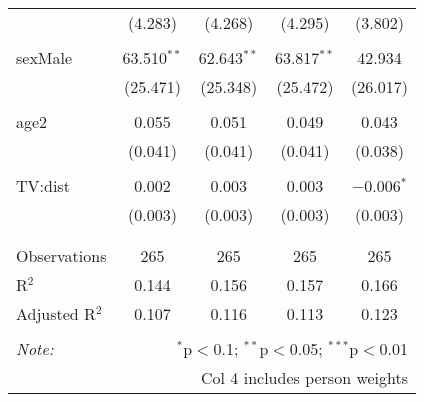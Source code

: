 \begin{table}[!htbp]
\begin{tabular}{@{\extracolsep{-5pt}}lcccc}
  & (4.283) & (4.268) & (4.295) & (3.802) \\ 
  & & & & \\ 
 sexMale & 63.510$^{**}$ & 62.643$^{**}$ & 63.817$^{**}$ & 42.934 \\ 
  & (25.471) & (25.348) & (25.472) & (26.017) \\ 
  & & & & \\ 
 age2 & 0.055 & 0.051 & 0.049 & 0.043 \\ 
  & (0.041) & (0.041) & (0.041) & (0.038) \\ 
  & & & & \\ 
 TV:dist & 0.002 & 0.003 & 0.003 & $-$0.006$^{*}$ \\ 
  & (0.003) & (0.003) & (0.003) & (0.003) \\ 
  & & & & \\ 
\hline \\[-1.8ex] 
Observations & 265 & 265 & 265 & 265 \\ 
R$^{2}$ & 0.144 & 0.156 & 0.157 & 0.166 \\ 
Adjusted R$^{2}$ & 0.107 & 0.116 & 0.113 & 0.123 \\ 
\hline 
\hline \\[-1.8ex] 
\textit{Note:}  & \multicolumn{4}{r}{$^{*}$p$<$0.1; $^{**}$p$<$0.05; $^{***}$p$<$0.01} \\ 
 & \multicolumn{4}{r}{Col 4 includes person weights} \\ 
\end{tabular} 
\end{table} 

